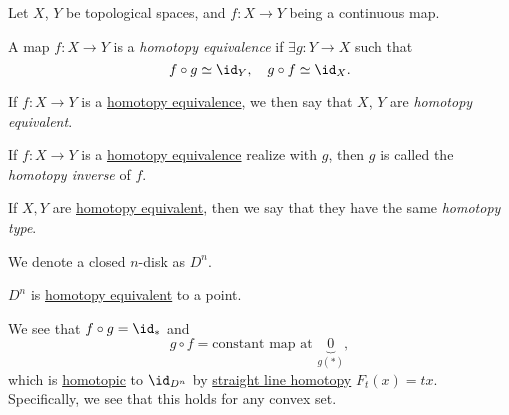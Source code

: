 \begin{definition*}
	Let \(X\), \(Y\) be topological spaces, and \(f\colon X\to Y\) being a continuous map.
	\begin{definition}\label{def:homotopy-equivalence}
		A map \(f\colon X\to Y\) is a \emph{homotopy equivalence} if \(\exists g\colon Y\to X\) such that
		\[
			f\circ g \simeq \id_Y, \quad g\circ f \simeq \id_X.
		\]
		\begin{center}
		\end{center}
	\end{definition}

	\begin{definition}\label{def:homotopy-equivalent}
		If \(f\colon X\to Y\) is a \hyperref[def:homotopy-equivalence]{homotopy equivalence}, we then say that \(X\), \(Y\) are \emph{homotopy equivalent}.
	\end{definition}

	\begin{definition}\label{def:homotopy-inverse}
		If \(f\colon X\to Y\) is a \hyperref[def:homotopy-equivalence]{homotopy equivalence} realize with \(g\), then \(g\) is called the \emph{homotopy inverse} of \(f\).
	\end{definition}

	\begin{definition}\label{def:homotopy-type}
		If \(X, Y\) are \hyperref[def:homotopy-equivalence]{homotopy equivalent}, then we say that they have the same \emph{homotopy type}.
	\end{definition}
\end{definition*}

\begin{notation}
	We denote a closed \(n\)-disk as \(D^n\).
\end{notation}

\begin{eg}
	\(D^n\) is \hyperref[def:homotopy-equivalence]{homotopy equivalent} to a point.
	\begin{center}
	\end{center}
\end{eg}
\begin{explanation}
	We see that \(f\circ g = \id_\ast\) and
	\[
		g\circ f = \text{constant map at }\underbrace{0}_{g(\ast)},
	\]
	which is \hyperref[def:homotopic]{homotopic} to \(\id_{D^n}\) by \hyperref[eg:lec1:straight-line-homotopy]{straight line homotopy} \(F_t(x) = tx\). Specifically, we see that this holds for any convex set.
\end{explanation}

